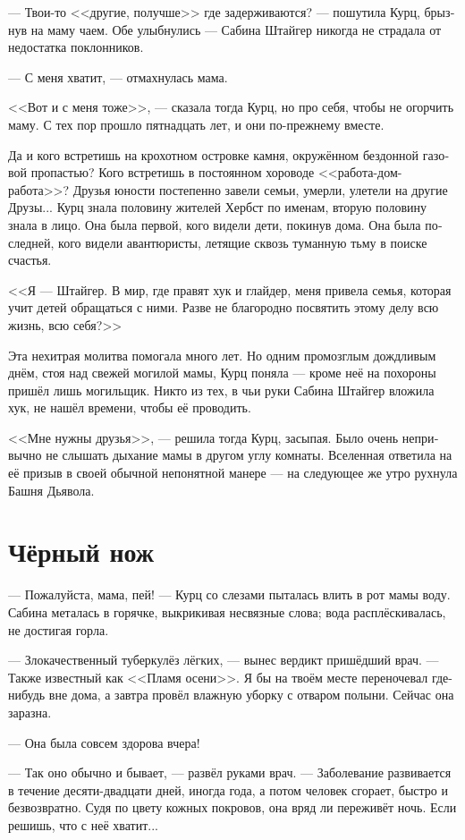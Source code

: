 \documentclass[a4paper,10pt,fleqn]{book}\usepackage{polyglossia}\setdefaultlanguage[babelshorthands=true]{russian}\setotherlanguage{english}\defaultfontfeatures{Ligatures=TeX,Mapping=tex-text}\usepackage{xcolor}\newcommand{\ml}[3]{#2}
\begin{document}
--- Твои-то <<другие, получше>> где задерживаются? --- пошутила Курц, брызнув на маму чаем.
Обе улыбнулись --- Сабина Штайгер никогда не страдала от недостатка поклонников.

--- С меня хватит, --- отмахнулась мама.

<<Вот и с меня тоже>>, --- сказала тогда Курц, но про себя, чтобы не огорчить маму.
С тех пор прошло пятнадцать лет, и они по-прежнему вместе.

Да и кого встретишь на крохотном островке камня, окружённом бездонной газовой пропастью?
Кого встретишь в постоянном хороводе <<работа-дом-работа>>?
Друзья юности постепенно завели семьи, умерли, улетели на другие Друзы...
Курц знала половину жителей Хербст по именам, вторую половину знала в лицо.
Она была первой, кого видели дети, покинув дома.
Она была последней, кого видели авантюристы, летящие сквозь туманную тьму в поиске счастья.

<<Я --- Штайгер.
В мир, где правят хук и глайдер, меня привела семья, которая учит детей обращаться с ними.
Разве не благородно посвятить этому делу всю жизнь, всю себя?>>

Эта нехитрая молитва помогала много лет.
Но одним промозглым дождливым днём, стоя над свежей могилой мамы, Курц поняла --- кроме неё на похороны пришёл лишь могильщик.
Никто из тех, в чьи руки Сабина Штайгер вложила хук, не нашёл времени, чтобы её проводить.

<<Мне нужны друзья>>, --- решила тогда Курц, засыпая.
Было очень непривычно не слышать дыхание мамы в другом углу комнаты.
Вселенная ответила на её призыв в своей обычной непонятной манере --- на следующее же утро рухнула Башня Дьявола.

\section{Чёрный нож}

--- Пожалуйста, мама, пей! --- Курц со слезами пыталась влить в рот мамы воду.
Сабина металась в горячке, выкрикивая несвязные слова;
вода расплёскивалась, не достигая горла.

--- Злокачественный туберкулёз лёгких, --- вынес вердикт пришёдший врач.
--- Также известный как <<Пламя осени>>.
Я бы на твоём месте переночевал где-нибудь вне дома, а завтра провёл влажную уборку с отваром полыни.
Сейчас она заразна.

--- Она была совсем здорова вчера!

--- Так оно обычно и бывает, --- развёл руками врач.
--- Заболевание развивается в течение десяти-двадцати дней, иногда года, а потом человек сгорает, быстро и безвозвратно.
Судя по цвету кожных покровов, она вряд ли переживёт ночь.
Если решишь, что с неё хватит...
\end{document}
